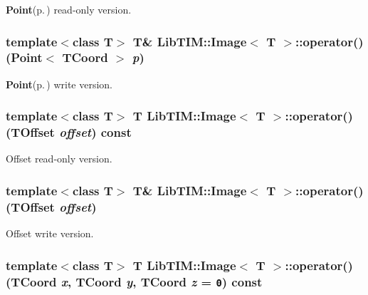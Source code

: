 {\bf Point}{\rm (p.\,\pageref{classLibTIM_1_1Point})} read-only version. 

\subsubsection{\setlength{\rightskip}{0pt plus 5cm}template$<$class T$>$ T\& {\bf Lib\-TIM::Image}$<$ T $>$::operator() ({\bf Point}$<$ {\bf TCoord} $>$ {\em p})\hspace{0.3cm}{\tt  [inline, inherited]}}\label{group__Image_ga45}


{\bf Point}{\rm (p.\,\pageref{classLibTIM_1_1Point})} write version. 

\subsubsection{\setlength{\rightskip}{0pt plus 5cm}template$<$class T$>$ T {\bf Lib\-TIM::Image}$<$ T $>$::operator() ({\bf TOffset} {\em offset}) const\hspace{0.3cm}{\tt  [inline, inherited]}}\label{group__Image_ga44}


Offset read-only version. 

\subsubsection{\setlength{\rightskip}{0pt plus 5cm}template$<$class T$>$ T\& {\bf Lib\-TIM::Image}$<$ T $>$::operator() ({\bf TOffset} {\em offset})\hspace{0.3cm}{\tt  [inline, inherited]}}\label{group__Image_ga43}


Offset write version. 

\subsubsection{\setlength{\rightskip}{0pt plus 5cm}template$<$class T$>$ T {\bf Lib\-TIM::Image}$<$ T $>$::operator() ({\bf TCoord} {\em x}, {\bf TCoord} {\em y}, {\bf TCoord} {\em z} = {\tt 0}) const\hspace{0.3cm}{\tt  [inline, inherited]}}\label{group__Image_ga42}


